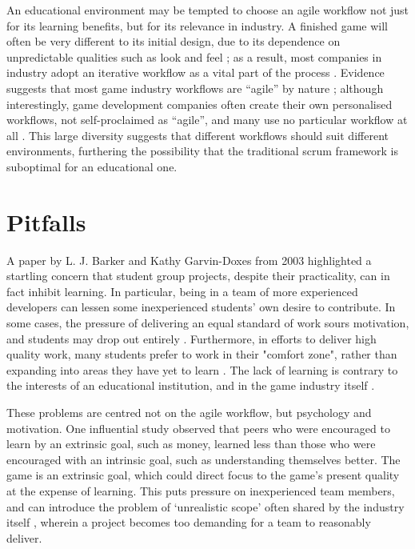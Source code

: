 \documentclass{scrartcl}
\begin{document}
An educational environment may be tempted to choose an agile workflow not just for its learning benefits, but for its relevance in industry. A finished game will often be very different to its initial design, due to its dependence on unpredictable qualities such as look and feel \cite{collaboration}; as a result, most companies in industry adopt an iterative workflow as a vital part of the process \cite{iteration, olddays, devstudy}. Evidence suggests that most game industry workflows are ``agile'' by nature \cite{olddays}; although interestingly, game development companies often create their own personalised workflows, not self-proclaimed as ``agile'', and many use no particular workflow at all \cite{devstudy}. This large diversity suggests that different workflows should suit different environments, furthering the possibility that the traditional scrum framework is suboptimal for an educational one.


\section{Pitfalls}
A paper by L. J. Barker and Kathy Garvin-Doxes from 2003 highlighted a startling concern that student group projects, despite their practicality, can in fact inhibit learning. In particular, being in a team of more experienced developers can lessen some inexperienced students' own desire to contribute. In some cases, the pressure of delivering an equal standard of work sours motivation, and students may drop out entirely \cite{group2003}. Furthermore, in efforts to deliver high quality work, many students prefer to work in their "comfort zone", rather than expanding into areas they have yet to learn \cite{group2003, group2005}. The lack of learning is contrary to the interests of an educational institution, and in the game industry itself \cite{collaboration, devstudy}.

These problems are centred not on the agile workflow, but psychology and motivation. One influential study \cite{motivation} observed that peers who were encouraged to learn by an extrinsic goal, such as money, learned less than those who were encouraged with an intrinsic goal, such as understanding themselves better. The game is an extrinsic goal, which could direct focus to the game's present quality at the expense of learning. This puts pressure on inexperienced team members, and can introduce the problem of `unrealistic scope' often shared by the industry itself \cite{problems}, wherein a project becomes too demanding for a team to reasonably deliver.
\end{document}
